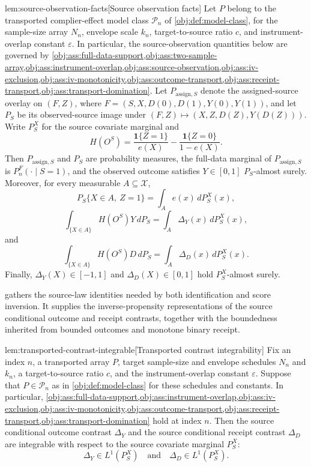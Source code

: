 \begin{lemmav}{lem:source-observation-facts}[Source observation facts]
Let \(P\) belong to the transported complier-effect model class \(\mathcal P_n\) of \cref{obj:def:model-class}, for the sample-size array \(N_n\), envelope scale \(k_n\), target-to-source ratio \(c\), and instrument-overlap constant \(\varepsilon\). In particular, the source-observation quantities below are governed by \cref{obj:ass:full-data-support,obj:ass:two-sample-array,obj:ass:instrument-overlap,obj:ass:source-observation,obj:ass:iv-exclusion,obj:ass:iv-monotonicity,obj:ass:outcome-transport,obj:ass:receipt-transport,obj:ass:transport-domination}. Let \(P_{\mathrm{assign},S}\) denote the assigned-source overlay on \((F,Z)\), where \(F=(S,X,D(0),D(1),Y(0),Y(1))\), and let \(P_S\) be its observed-source image under \((F,Z)\mapsto (X,Z,D(Z),Y(D(Z)))\). Write \(P_S^X\) for the source covariate marginal and
\[
H(O^S)
=
\frac{\mathbf 1\{Z=1\}}{e(X)}
-
\frac{\mathbf 1\{Z=0\}}{1-e(X)} .
\]
Then \(P_{\mathrm{assign},S}\) and \(P_S\) are probability measures, the full-data marginal of \(P_{\mathrm{assign},S}\) is \(P_n^F(\cdot\mid S=1)\), and the observed outcome satisfies \(Y\in[0,1]\) \(P_S\)-almost surely. Moreover, for every measurable \(A\subseteq\mathcal X\),
\[
P_S\{X\in A,\ Z=1\}
=
\int_A e(x)\,dP_S^X(x),
\]
\[
\int_{\{X\in A\}} H(O^S)Y\,dP_S
=
\int_A \Delta_Y(x)\,dP_S^X(x),
\]
and
\[
\int_{\{X\in A\}} H(O^S)D\,dP_S
=
\int_A \Delta_D(x)\,dP_S^X(x).
\]
Finally, \(\Delta_Y(X)\in[-1,1]\) and \(\Delta_D(X)\in[0,1]\) hold \(P_S^X\)-almost surely.
\end{lemmav}

 gathers the source-law identities needed by both identification and score inversion. It supplies the inverse-propensity representations of the source conditional outcome and receipt contrasts, together with the boundedness inherited from bounded outcomes and monotone binary receipt.

\begin{lemmav}{lem:transported-contrast-integrable}[Transported contrast integrability]
Fix an index \(n\), a transported array \(P\), target sample-size and envelope schedules \(N_n\) and \(k_n\), a target-to-source ratio \(c\), and the instrument-overlap constant \(\varepsilon\). Suppose that \(P\in\mathcal P_n\) as in \cref{obj:def:model-class} for these schedules and constants. In particular, \cref{obj:ass:full-data-support,obj:ass:instrument-overlap,obj:ass:iv-exclusion,obj:ass:iv-monotonicity,obj:ass:outcome-transport,obj:ass:receipt-transport,obj:ass:transport-domination} hold at index \(n\). Then the source conditional outcome contrast \(\Delta_Y\) and the source conditional receipt contrast \(\Delta_D\) are integrable with respect to the source covariate marginal \(P_S^X\):
\[
\Delta_Y\in L^1(P_S^X)
\quad\text{and}\quad
\Delta_D\in L^1(P_S^X).
\]
\end{lemmav}

